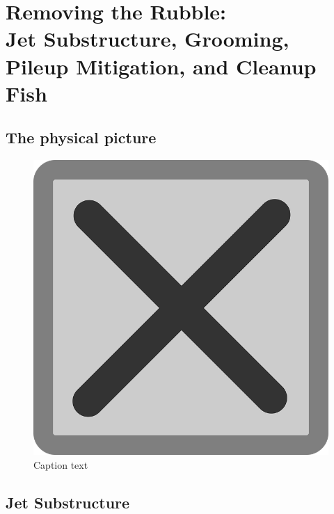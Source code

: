 \chapter{Removing the Rubble:\\Jet Substructure, Grooming, Pileup Mitigation, and Cleanup Fish}

\section{The physical picture}

\begin{figure}[t!]
    \centering
    \includegraphics[width=\textwidth]{figures/tempfig}

    \caption{
        Caption text
    }

    \label{fig:label}
\end{figure}

\section{Jet Substructure}

